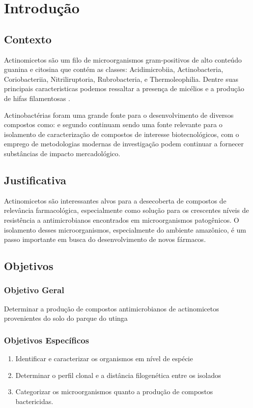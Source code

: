 \chapter{Introdução}
\label{cap:introducao}

\section{Contexto}
Actinomicetos são um filo de microorganismos gram-positivos de alto conteúdo
guanina e citosina que contém as classes: Acidimicrobiia, Actinobacteria, 
Coriobacteriia, Nitriliruptoria, Rubrobacteria, e Thermoleophilia\cite{yadav2018}.
Dentre suas principais caracteristicas podemos ressaltar a presença de micélios
e a produção de hifas filamentosas \cite{chater2016}.

Actinobactérias foram uma grande fonte para o desenvolvimento de diversos
compostos como:%
 e segundo  continuam sendo uma fonte relevante
para o isolamento de caracterização de compostos de interesse biotecnológicos, com o
emprego de metodologias modernas de investigação podem continuar a fornecer 
substâncias de impacto mercadológico.

\section{Justificativa}
Actinomicetos são interessantes alvos para a desecoberta de compostos
de relevância farmacológica, especialmente como solução para os crescentes níveis
de resistência a antimicrobianos encontrados em microorganismos patogênicos.
O isolamento desses microorganismos, especialmente do ambiente amazônico,
é um passo importante em busca do desenvolvimento de novos fármacos.

\section{Objetivos}

\subsection{Objetivo Geral}

Determinar a produção de compostos antimicrobianos de actinomicetos
provenientes do solo do parque do utinga

\subsection{Objetivos Específicos}
\begin{enumerate}
    \item Identificar e caracterizar os organismos em nível de espécie
    \item Determinar o perfil clonal e a distância filogenética entre os isolados
    \item Categorizar os microorganismos quanto a produção de compostos bactericidas.
\end{enumerate}

